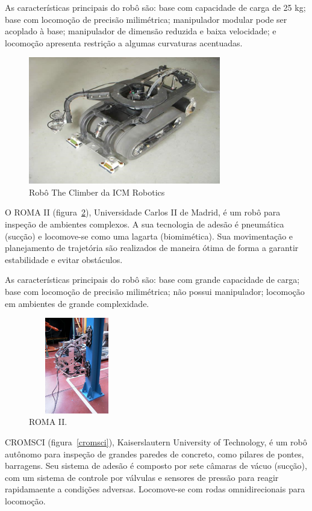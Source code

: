 As características principais do robô são: base com capacidade de carga de 25
kg; base com locomoção de precisão milimétrica; manipulador modular pode ser
acoplado à base; manipulador de dimensão reduzida e baixa velocidade; e
locomoção apresenta restrição a algumas curvaturas acentuadas.

\begin{figure}[ht]
\centering
\includegraphics[width=8.4cm]{sota/figs/climbers/icm.png}
\caption{Robô The Climber da ICM Robotics}
\label{icm}
\end{figure}

O ROMA II (figura~\ref{roma2}), Universidade Carlos II de Madrid, é um robô para
inspeção de ambientes complexos. A sua tecnologia de adesão é pneumática (sucção) e
locomove-se como uma lagarta (biomimética). Sua movimentação e planejamento de
trajetória são realizados de maneira ótima de forma a garantir estabilidade e
evitar obstáculos. 

As características principais do robô são: base com grande capacidade de carga;
base com locomoção de precisão milimétrica; não possui manipulador; locomoção em
ambientes de grande complexidade.

\begin{figure}[ht]
\centering
\includegraphics[width=4.2cm,height=4.2cm]{sota/figs/climbers/roma2.jpg}
\caption{ROMA II.}
\label{roma2}
\end{figure}

CROMSCI (figura~\ref{cromsci}), Kaiserslautern University of Technology, é um
robô autônomo para inspeção de grandes paredes de concreto, como pilares de pontes, barragens. Seu
sistema de adesão é composto por sete câmaras de vácuo (sucção), com um sistema
de controle por válvulas e sensores de pressão para reagir rapidamaente a
condições adversas. Locomove-se com rodas omnidirecionais para locomoção.

